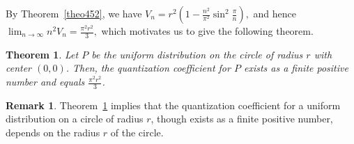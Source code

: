 \documentclass[12pt, reqno]{amsart}
\theoremstyle{plain}
\newtheorem{theorem1}[subsubsection]{Theorem}
\theoremstyle{definition}
\newtheorem{remark1}[subsubsection]{Remark}
\begin{document}
By Theorem~\ref{theo452}, we have
$
V_n = r^2 \left(1 - \frac{n^2}{\pi^2} \sin^2 \frac{\pi}{n} \right),
$
and hence
$
\lim_{n \to \infty} n^2 V_n = \frac{\pi^2 r^2}{3},
$
which motivates us to give the following theorem.

\begin{theorem1}\label{theo453}
Let $P$ be the uniform distribution on the circle of radius $r$ with center $(0, 0)$. Then, the quantization coefficient for $P$ exists as a finite positive number and equals $\frac{\pi ^2 r^2}{3}$.
\end{theorem1}   
 
 \begin{remark1}\label{rem6}
 Theorem~\ref{theo453} implies that the quantization coefficient for a uniform distribution on a circle of radius $r$, though exists as a finite positive number, depends on the radius $r$ of the circle. 
 \end{remark1}
\end{document}
